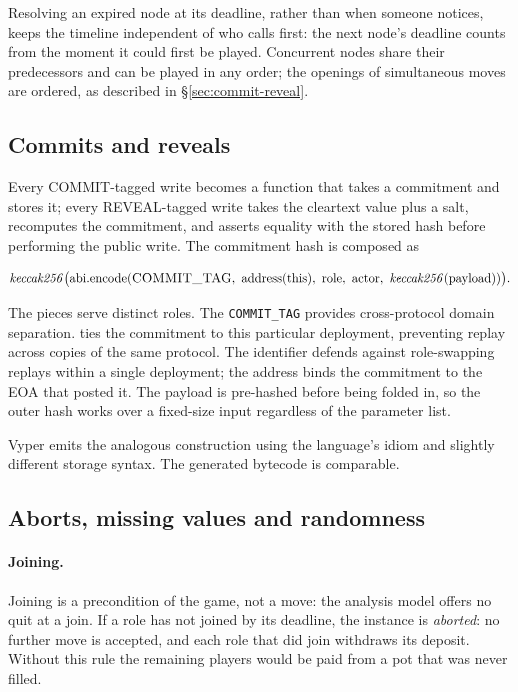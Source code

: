 Resolving an expired node at its deadline, rather than when someone
notices, keeps the timeline independent of who calls first: the next
node's deadline counts from the moment it could first be played.
Concurrent nodes share their predecessors and can be played in any
order; the openings of simultaneous moves are ordered, as described
in \S\ref{sec:commit-reveal}.

\subsection{Commits and reveals}
\label{sec:solidity:commit-reveal}

Every COMMIT-tagged write becomes a function that takes a
 commitment and stores it; every REVEAL-tagged write
takes the cleartext value plus a salt, recomputes the commitment,
and asserts equality with the stored hash before performing the
public write.  The commitment hash is composed as

\begin{equation*}
  \mathit{keccak256}\bigl(
    \mathrm{abi.encode}(
      \textsc{COMMIT\_TAG},\
      \mathrm{address(this)},\
      \mathrm{role},\
      \mathrm{actor},\
      \mathit{keccak256}(\mathrm{payload})
    )
  \bigr).
\end{equation*}

The pieces serve distinct roles.  The \texttt{COMMIT\_TAG} provides
cross-protocol domain separation.   ties the
commitment to this particular deployment, preventing replay across
copies of the same protocol.  The  identifier defends
against role-swapping replays within a single deployment; the
\TT{actor} address binds the commitment to the EOA that posted it.
The payload is pre-hashed before being folded in, so the outer
hash works over a fixed-size input regardless of the parameter
list.

Vyper emits the analogous construction using the language's
\TT{assert} idiom and slightly different storage syntax.  The
generated bytecode is comparable.

\subsection{Aborts, missing values and randomness}
\label{sec:solidity:bail}

\paragraph{Joining.}  Joining is a precondition of the game, not a
move: the analysis model offers no quit at a join.  If a role has not
joined by its deadline, the instance is \emph{aborted}: no further move
is accepted, and each role that did join withdraws its deposit.
Without this rule the remaining players would be paid from a pot that
was never filled.

